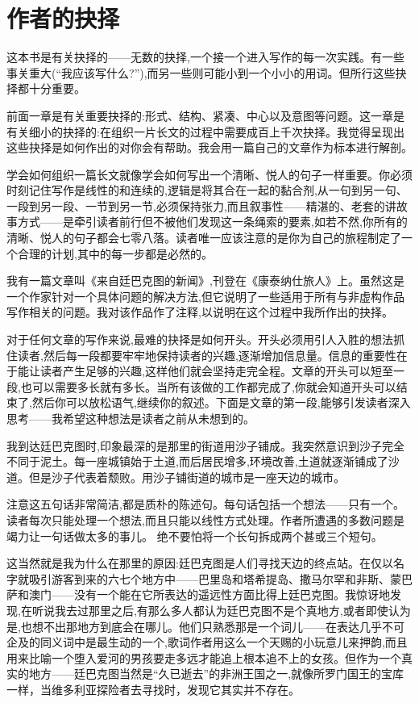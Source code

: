 \chapter{作者的抉择}
这本书是有关抉择的——无数的抉择,一个接一个进入写作的每一次实践。有一些事关重大(“我应该写什么?”),而另一些则可能小到一个小小的用词。但所行这些抉择都十分重要。


前面一章是有关重要抉择的:形式、结构、紧凑、中心以及意图等问题。这一章是有关细小的抉择的:在组织一片长文的过程中需要成百上千次抉择。我觉得呈现出这些抉择是如何作出的对你会有帮助。我会用一篇自己的文章作为标本进行解剖。

学会如何组织一篇长文就像学会如何写出一个清晰、悦人的句子一样重要。你必须时刻记住写作是线性的和连续的,逻辑是将其合在一起的黏合剂,从一句到另一句、一段到另一段、一节到另一节,必须保持张力,而且叙事性——精湛的、老套的讲故事方式——是牵引读者前行但不被他们发现这一条绳索的要素,如若不然,你所有的清晰、悦人的句子都会七零八落。读者唯一应该注意的是你为自己的旅程制定了一个合理的计划,其中的每一步都是必然的。

我有一篇文章叫《来自廷巴克图的新闻》,刊登在《康泰纳仕旅人》上。虽然这是一个作家针对一个具体问题的解决方法,但它说明了一些适用于所有与非虚构作品写作相关的问题。我对该作品作了注释,以说明在这个过程中我所作出的抉择。

对于任何文章的写作来说,最难的抉择是如何开头。开头必须用引人入胜的想法抓住读者,然后每一段都要牢牢地保持读者的兴趣,逐渐增加信息量。信息的重要性在于能让读者产生足够的兴趣,这样他们就会坚持走完全程。文章的开头可以短至一段,也可以需要多长就有多长。当所有该做的工作都完成了,你就会知道开头可以结束了,然后你可以放松语气,继续你的叙述。下面是文章的第一段,能够引发读者深入思考——我希望这种想法是读者之前从未想到的。

我到达廷巴克图时,印象最深的是那里的街道用沙子铺成。我突然意识到沙子完全不同于泥土。每一座城镇始于土道,而后居民增多,环境改善,土道就逐渐铺成了沙道。但是沙子代表着颓败。用沙子铺街道的城市是一座天边的城市。

注意这五句话非常简洁,都是质朴的陈述句。每句话包括一个想法——只有一个。读者每次只能处理一个想法,而且只能以线性方式处理。作者所遭遇的多数问题是竭力让一句话做太多的事儿。
绝不要怕将一个长句拆成两个甚或三个短句。

这当然就是我为什么在那里的原因:廷巴克图是人们寻找天边的终点站。在仅以名字就吸引游客到来的六七个地方中——巴里岛和塔希提岛、撒马尔罕和非斯、蒙巴萨和澳门——没有一个能在它所表达的遥远性方面比得上廷巴克图。我惊讶地发现,在听说我去过那里之后,有那么多人都认为廷巴克图不是个真地方,或者即使认为是,也想不出那地方到底会在哪儿。他们只熟悉那是一个词儿——在表达几乎不可企及的同义词中是最生动的一个,歌词作者用这么一个天赐的小玩意儿来押韵,而且用来比喻一个堕入爱河的男孩要走多远才能追上根本追不上的女孩。但作为一个真实的地方——廷巴克图当然是“久已逝去”的非洲王国之一,就像所罗门国王的宝库一样，当维多利亚探险者去寻找时，发现它其实并不存在。

